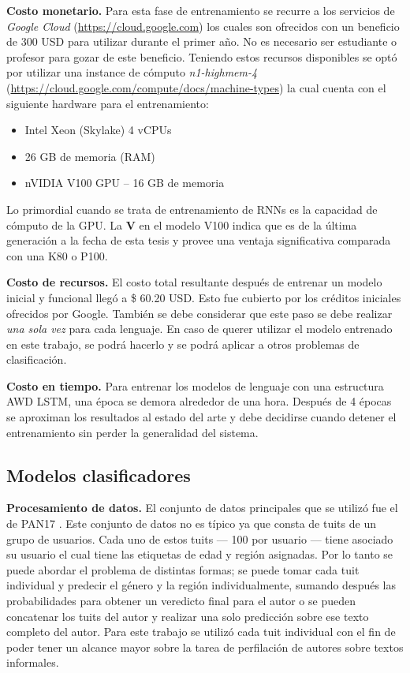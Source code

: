 \textbf{Costo monetario.} Para esta fase de entrenamiento se recurre a los servicios de \textit{Google Cloud} (\href{https://cloud.google.com/free}{https://cloud.google.com}) los cuales son ofrecidos con un beneficio de 300 USD para utilizar durante el primer año. No es necesario ser estudiante o profesor para gozar de este beneficio. Teniendo estos recursos disponibles se optó por utilizar una instance de cómputo \emph{n1-highmem-4} (\url{https://cloud.google.com/compute/docs/machine-types}) la cual cuenta con	el siguiente hardware para el entrenamiento:


\begin{itemize}
\item Intel Xeon (Skylake) 4 vCPUs
\item 26 GB de memoria (RAM)
\item nVIDIA V100 GPU -- 16 GB de memoria
\end{itemize}

Lo primordial cuando se trata de entrenamiento de RNNs es la capacidad de cómputo de la GPU. La \textbf{V} en el modelo V100 indica que es de la última generación a la fecha de esta tesis y provee una ventaja significativa comparada con una K80 o P100.

\textbf{Costo de recursos.} El costo total resultante después de entrenar un modelo inicial y funcional llegó a \$ 60.20 USD. Esto fue cubierto por los créditos iniciales ofrecidos por Google. También se debe considerar que este paso se debe realizar \emph{una sola vez} para cada lenguaje. En caso de querer utilizar el modelo entrenado en este trabajo, se podrá hacerlo y se podrá aplicar a otros problemas de clasificación.

\textbf{Costo en tiempo.} Para entrenar los modelos de lenguaje con una estructura AWD LSTM, una época se demora alrededor de una hora. Después de 4 épocas se aproximan los resultados al estado del arte y debe decidirse cuando detener el entrenamiento sin perder la generalidad del sistema.

\subsection{Modelos clasificadores}

\textbf{Procesamiento de datos.} El conjunto de datos principales que se utilizó fue el de PAN17 \parencite{rangel2017overview}. Este conjunto de datos no es típico ya que consta de tuits de un grupo de usuarios. Cada uno de estos tuits --- 100 por usuario --- tiene asociado su usuario el cual tiene las etiquetas de edad y región asignadas. Por lo tanto se puede abordar el problema de distintas formas; se puede tomar cada tuit individual y predecir el género y la región individualmente, sumando después las probabilidades para obtener un veredicto final para el autor o se pueden concatenar los tuits del autor y realizar una solo predicción sobre ese texto completo del autor. Para este trabajo se utilizó cada tuit individual con el fin de poder tener un alcance mayor sobre la tarea de perfilación de autores sobre textos informales.

